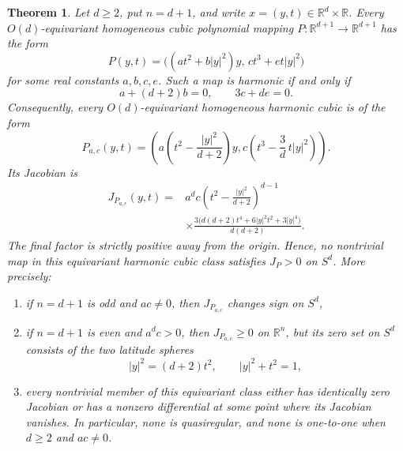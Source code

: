 \documentclass[10pt]{amsart}
\numberwithin{equation}{section}
\newtheorem{theorem}{Theorem}[section]
\theoremstyle{definition}
\newcommand{\R}{\mathbb R}
\begin{document}
\begin{theorem}
\label{thm-equivariant-cubic-classification}
Let \(d\ge2\), put \(n=d+1\), and write \(x=(y,t)\in\R^d\times\R\). Every
\(O(d)\)-equivariant homogeneous cubic polynomial mapping
\(P:\R^{d+1}\to\R^{d+1}\) has the form
\[
        P(y,t)=\bigl((a t^2+b|y|^2)y,\,c t^3+e t|y|^2\bigr)
\]
for some real constants \(a,b,c,e\). Such a map is harmonic if and only if
\[
        a+(d+2)b=0,
        \qquad
        3c+de=0.
\]
Consequently, every \(O(d)\)-equivariant homogeneous harmonic cubic is of the
form
\[
        P_{a,c}(y,t)=
        \left(
        a\left(t^2-\frac{|y|^2}{d+2}\right)y,
        c\left(t^3-\frac3d\,t|y|^2\right)
        \right).
\]
Its Jacobian is
\[
\begin{aligned}
        J_{P_{a,c}}(y,t)
        ={}&a^d c
        \left(t^2-\frac{|y|^2}{d+2}\right)^{d-1}  \\
        &\times
        \frac{3\bigl(d(d+2)t^4+6|y|^2t^2+3|y|^4\bigr)}{d(d+2)}.
\end{aligned}
\]
The final factor is strictly positive away from the origin. Hence, no
nontrivial map in this equivariant harmonic cubic class satisfies
\(J_P>0\) on \(S^d\). More precisely:
\begin{enumerate}[label=(\roman*)]
\item if \(n=d+1\) is odd and \(ac\ne0\), then \(J_{P_{a,c}}\) changes sign
on \(S^d\),
\item if \(n=d+1\) is even and \(a^d c>0\), then \(J_{P_{a,c}}\ge0\) on
\(\R^n\), but its zero set on \(S^d\) consists of the two latitude spheres
\[
        |y|^2=(d+2)t^2,
        \qquad |y|^2+t^2=1,
\]
\item every nontrivial member of this equivariant class either has
identically zero Jacobian or has a nonzero differential at some point where
its Jacobian vanishes. In particular, none is quasiregular, and none is
one-to-one when \(d\ge2\) and \(ac\ne0\).
\end{enumerate}
\end{theorem}
\end{document}
